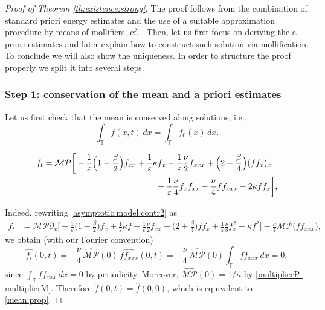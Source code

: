 \documentclass[reqno]{amsart}
\newcommand{\TT}{\mathbb T}
\theoremstyle{definition}
\numberwithin{equation}{section}
\numberwithin{theorem}{section}
\numberwithin{definition}{section}
\begin{document}
\begin{proof}[Proof of Theorem \ref{th:existence:strong}]
The proof follows from the combination of standard priori energy estimates and the use of a suitable approximation procedure by means of mollifiers, cf. \cite{MajdaBertozzi2002}. Then, let us first focus on deriving the a priori estimates and later explain how to construct such solution via mollification. To conclude we will also show the uniqueness. In order to structure the proof properly we split it into several steps.

\subsubsection*{\underline{Step 1: conservation of the mean and a priori estimates}}

Let us first check that the mean is conserved along solutions, i.e.,
\begin{equation}\label{mean:prop}
	\int_{\TT} f(x,t)\,dx=\int_{\TT} f_{0}(x)\,dx.
\end{equation}

\begin{align}\label{asymptotic:model:contr2}
	f_{t}&=\mathcal{M}\mathcal{P}\bigg[ - \frac{1}{\varepsilon}\Big(1-\frac{\beta}{2}\Big)f_{xx}
	+ \frac{1}{\varepsilon}\kappa f_{x}
	- \frac{1}{\varepsilon}\frac{\nu}{2}f_{xxx}
	+ \Big(2+\frac{\beta}{4}\Big)(f f_{x})_{x}    \nonumber \\
	&\hspace{4.7cm}+ \frac{1}{\varepsilon}\frac{\nu}{4}f_{x}f_{xx}
	-\frac{\nu}{4}ff_{xxx}
	-2\kappa ff_{x}\bigg],
\end{align}


Indeed, rewriting \eqref{asymptotic:model:contr2} as
\begin{align*}
	f_{t}&=\mathcal{M}\mathcal{P}\partial_{x}\bigg[ - \frac{1}{\varepsilon}\Big(1-\frac{\beta}{2}\Big)f_{x}+ \frac{1}{\varepsilon}\kappa f
	- \frac{1}{\varepsilon}\frac{\nu}{2}f_{xx} + \Big(2+\frac{\beta}{4}\Big)f f_{x}
	+ \frac{1}{\varepsilon}\frac{\nu}{8}f_{x}^{2} -\kappa f^{2}\bigg]
	-\frac{\nu}{4}\mathcal{M}\mathcal{P}\Big(ff_{xxx}\Big),
\end{align*}
we obtain (with our Fourier convention)
\[
\widehat{f_t}(0,t)
=-\frac{\nu}{4}\,\widehat{\mathcal{M}\mathcal{P}}(0)\,\widehat{ff_{xxx}}(0,t)
= -\frac{\nu}{4}\,\widehat{\mathcal{M}\mathcal{P}}(0)\int_{\TT} f f_{xxx}\,dx = 0,
\]
since $\int_{\TT} f f_{xxx}\,dx=0$ by periodicity. Moreover,
$\widehat{\mathcal{M}\mathcal{P}}(0)=1/\kappa$ by \eqref{multiplierP-multiplierM}.
Therefore $\widehat{f}(0,t)=\widehat{f}(0,0)$, which is equivalent to \eqref{mean:prop}. \medskip


\end{proof}
\end{document}
